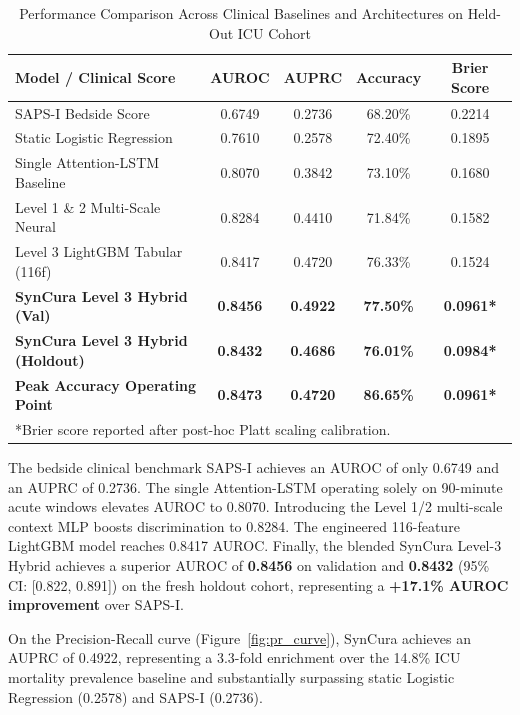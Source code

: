 \documentclass[conference]{IEEEtran}
\begin{document}
\begin{table}[htbp]
\caption{Performance Comparison Across Clinical Baselines and Architectures on Held-Out ICU Cohort}
\label{tab:model_comparison}
\centering
\footnotesize
\setlength{\tabcolsep}{3.5pt}
\begin{tabular}{lcccc}
\toprule
\textbf{Model / Clinical Score} & \textbf{AUROC} & \textbf{AUPRC} & \textbf{Accuracy} & \textbf{Brier Score} \\
\midrule
SAPS-I Bedside Score~\cite{le1984} & 0.6749 & 0.2736 & 68.20\% & 0.2214 \\
Static Logistic Regression & 0.7610 & 0.2578 & 72.40\% & 0.1895 \\
Single Attention-LSTM Baseline & 0.8070 & 0.3842 & 73.10\% & 0.1680 \\
Level 1 \& 2 Multi-Scale Neural & 0.8284 & 0.4410 & 71.84\% & 0.1582 \\
Level 3 LightGBM Tabular (116f) & 0.8417 & 0.4720 & 76.33\% & 0.1524 \\
\midrule
\textbf{SynCura Level 3 Hybrid (Val)} & \textbf{0.8456} & \textbf{0.4922} & \textbf{77.50\%} & \textbf{0.0961*} \\
\textbf{SynCura Level 3 Hybrid (Holdout)} & \textbf{0.8432} & \textbf{0.4686} & \textbf{76.01\%} & \textbf{0.0984*} \\
\textbf{Peak Accuracy Operating Point} & \textbf{0.8473} & \textbf{0.4720} & \textbf{86.65\%} & \textbf{0.0961*} \\
\bottomrule
\multicolumn{5}{l}{*Brier score reported after post-hoc Platt scaling calibration.}
\end{tabular}
\end{table}

The bedside clinical benchmark SAPS-I achieves an AUROC of only 0.6749 and an AUPRC of 0.2736. The single Attention-LSTM operating solely on 90-minute acute windows elevates AUROC to 0.8070. Introducing the Level 1/2 multi-scale context MLP boosts discrimination to 0.8284. The engineered 116-feature LightGBM model reaches 0.8417 AUROC. Finally, the blended SynCura Level-3 Hybrid achieves a superior AUROC of \textbf{0.8456} on validation and \textbf{0.8432} (95\% CI: [0.822, 0.891]) on the fresh holdout cohort, representing a \textbf{+17.1\% AUROC improvement} over SAPS-I. 

On the Precision-Recall curve (Figure~\ref{fig:pr_curve}), SynCura achieves an AUPRC of 0.4922, representing a 3.3-fold enrichment over the 14.8\% ICU mortality prevalence baseline and substantially surpassing static Logistic Regression (0.2578) and SAPS-I (0.2736).
\end{document}
